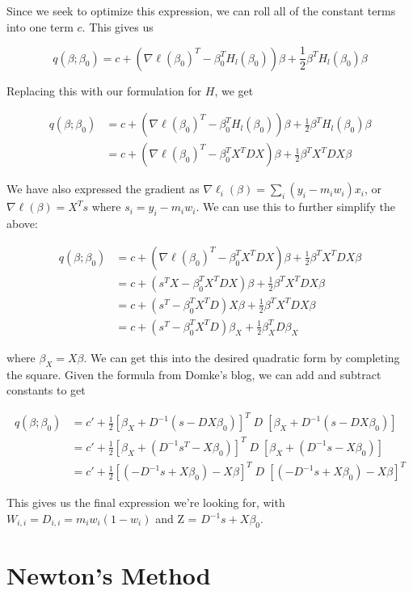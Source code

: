 \documentclass{article}
\begin{document}
Since we seek to optimize this expression, we can roll all of the constant terms
into one term $c$. This gives us

\[
 q(\beta ; \beta_0) = c + \left(  \nabla \ell(\beta_0)^T - \beta_0^T
   H_l(\beta_0) \right) \beta + \frac{1}{2} \beta^T H_l(\beta_0) \beta
\]

Replacing this with our formulation for $H$, we get

\begin{align*}
  q(\beta; \beta_0)
  &= c + \left(  \nabla \ell(\beta_0)^T - \beta_0^T
    H_l(\beta_0) \right) \beta + \frac{1}{2} \beta^T H_l(\beta_0) \beta\\
  &= c + \left( \nabla \ell(\beta_0)^T - \beta_0^T X^TDX \right) \beta
    + \frac{1}{2} \beta^T X^TDX \beta
\end{align*}

We have also expressed the gradient as $\nabla \ell_i(\beta) = \sum\limits_i
(y_i - m_iw_i) x_i$, or $\nabla \ell(\beta) = X^Ts$ where $s_i = y_i - m_iw_i$.
We can use this to further simplify the above:

\begin{align*}
  q(\beta; \beta_0)
  &= c + \left( \nabla \ell(\beta_0)^T - \beta_0^T X^TDX \right) \beta
    + \frac{1}{2} \beta^T X^TDX \beta\\
  &=  c + \left( s^TX - \beta_0^T X^TDX \right) \beta
    + \frac{1}{2} \beta^T X^TDX \beta\\
  &= c + \left( s^T - \beta_0^T X^T D \right) X \beta + 
    \frac{1}{2} \beta^T X^TDX \beta\\
  &= c + \left( s^T - \beta_0^T X^T D \right) \beta_X +
    \frac{1}{2} \beta_X^T D \beta_X
\end{align*}

where $\beta_X = X\beta$. We can get this into the desired quadratic form by
completing the square. Given the formula from Domke's blog, we can add and
subtract constants to get

\begin{align*}
  q(\beta ; \beta_0)
  &= c' + \frac{1}{2} [\beta_X + D^{-1}(s - DX\beta_0)]^T \; D \; [\beta_X + D^{-1}(s - DX\beta_0)]\\
  &= c' + \frac{1}{2} [\beta_X + (D^{-1}s^T - X\beta_0)]^T \; D \; [\beta_X + (D^{-1}s - X\beta_0)]\\
  &= c' + \frac{1}{2} [(-D^{-1}s + X \beta_0 ) - X \beta]^T \; D \; [(-D^{-1}s + X \beta_0 ) - X \beta]^T 
\end{align*}

This gives us the final expression we're looking for, with $W_{i,i} = D_{i,i} = m_iw_i(1-w_i)$ and 
Z = $D^{-1}s + X\beta_0 $.

\section{Newton's Method}
\end{document}
